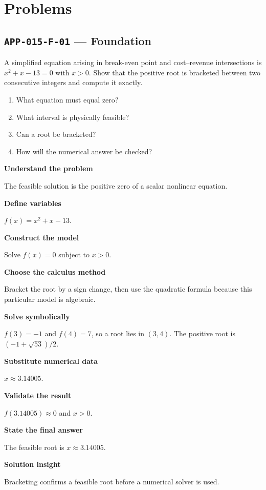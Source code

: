 \documentclass[11pt]{book}
\newcommand{\pid}[1]{\texttt{#1}}
\begin{document}
\section*{Problems}
\subsection*{\pid{APP-015-F-01} — Foundation}
\begin{problembox}
A simplified equation arising in break-even point and cost–revenue intersections is $x^2+x-13=0$ with $x>0$. Show that the positive root is bracketed between two consecutive integers and compute it exactly.
\end{problembox}
\begin{promptbox}\begin{enumerate}
\item What equation must equal zero?
\item What interval is physically feasible?
\item Can a root be bracketed?
\item How will the numerical answer be checked?
\end{enumerate}\end{promptbox}
\begin{solutionbox}
\textbf{Understand the problem}\par The feasible solution is the positive zero of a scalar nonlinear equation.\par\medskip
\textbf{Define variables}\par $f(x)=x^2+x-13$.\par\medskip
\textbf{Construct the model}\par Solve $f(x)=0$ subject to $x>0$.\par\medskip
\textbf{Choose the calculus method}\par Bracket the root by a sign change, then use the quadratic formula because this particular model is algebraic.\par\medskip
\textbf{Solve symbolically}\par $f(3)=-1$ and $f(4)=7$, so a root lies in $(3,4)$. The positive root is $(-1+\sqrt{53})/2$.\par\medskip
\textbf{Substitute numerical data}\par $x\approx 3.14005$.\par\medskip
\textbf{Validate the result}\par $f(3.14005)\approx 0$ and $x>0$.\par\medskip
\textbf{State the final answer}\par The feasible root is $x\approx 3.14005$.\par\medskip
\textbf{Solution insight}\par Bracketing confirms a feasible root before a numerical solver is used.\par\medskip
\end{solutionbox}
\end{document}
